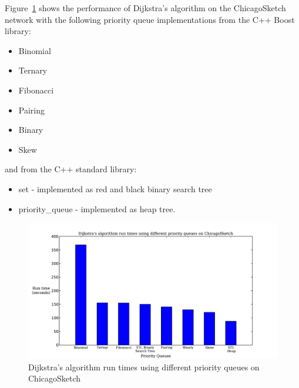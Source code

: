 Figure~\ref{fig:pq_runtime} shows the performance of Dijkstra's algorithm on the ChicagoSketch network with the following priority queue implementations from the C++ Boost library:
\begin{itemize}
    \item Binomial
    \item Ternary
    \item Fibonacci
    \item Pairing
    \item Binary
    \item Skew
\end{itemize}
and from the C++ standard library:
\begin{itemize}
    \item set - implemented as red and black binary search tree
    \item priority\_queue - implemented as heap tree.
\end{itemize}

\begin{figure}[H]
    \centering
    \includegraphics[width=\textwidth]{img/pq_runtime}
    \caption{Dijkstra's algorithm run times using different priority queues on ChicagoSketch}
    \label{fig:pq_runtime}
\end{figure}

